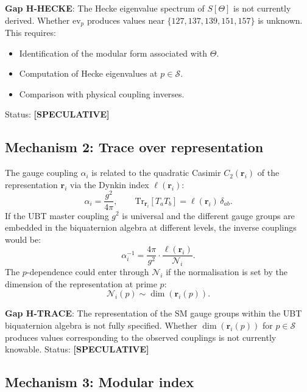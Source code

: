 \documentclass[12pt,a4paper]{article}
\theoremstyle{definition}
\theoremstyle{remark}
\newcommand{\spec}{\textcolor{purple!60!black}{\textbf{[SPECULATIVE]}}}
\begin{document}
\begin{gapbox}
\textbf{Gap H-HECKE}: The Hecke eigenvalue spectrum of $S[\Theta]$ is not
currently derived.  Whether $\mathrm{ev}_p$ produces values near $\{127, 137,
139, 151, 157\}$ is unknown.  This requires:
\begin{itemize}
\item Identification of the modular form associated with $\Theta$.
\item Computation of Hecke eigenvalues at $p \in \mathcal{S}$.
\item Comparison with physical coupling inverses.
\end{itemize}
Status: \spec
\end{gapbox}

\subsection{Mechanism 2: Trace over representation}

The gauge coupling $\alpha_i$ is related to the quadratic Casimir $C_2(\mathbf{r}_i)$
of the representation $\mathbf{r}_i$ via the Dynkin index $\ell(\mathbf{r}_i)$:
\begin{equation}
  \alpha_i = \frac{g^2}{4\pi}, \qquad
  \mathrm{Tr}_{\mathbf{r}_i}[T_a T_b] = \ell(\mathbf{r}_i)\,\delta_{ab}.
\end{equation}
If the UBT master coupling $g^2$ is universal and the different gauge groups
are embedded in the biquaternion algebra at different levels, the inverse
couplings would be:
\begin{equation}
  \alpha_i^{-1} = \frac{4\pi}{g^2} \cdot \frac{\ell(\mathbf{r}_i)}{\mathcal{N}_i}.
  \label{eq:trace_projection}
\end{equation}
The $p$-dependence could enter through $\mathcal{N}_i$ if the normalisation is
set by the dimension of the representation at prime $p$:
\begin{equation}
  \mathcal{N}_i(p) \sim \dim(\mathbf{r}_i(p)).
\end{equation}

\begin{gapbox}
\textbf{Gap H-TRACE}: The representation of the SM gauge groups within the
UBT biquaternion algebra is not fully specified.  Whether $\dim(\mathbf{r}_i(p))$
for $p \in \mathcal{S}$ produces values corresponding to the observed couplings
is not currently knowable.
Status: \spec
\end{gapbox}

\subsection{Mechanism 3: Modular index}
\end{document}
